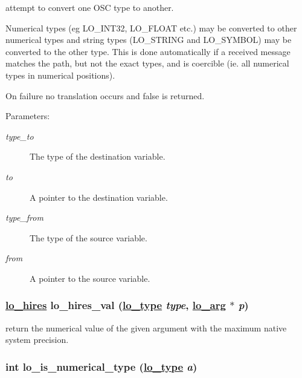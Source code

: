 attempt to convert one OSC type to another. 

Numerical types (eg LO\_\-INT32, LO\_\-FLOAT etc.) may be converted to other numerical types and string types (LO\_\-STRING and LO\_\-SYMBOL) may be converted to the other type. This is done automatically if a received message matches the path, but not the exact types, and is coercible (ie. all numerical types in numerical positions).

On failure no translation occurs and false is returned.

\begin{Desc}
\item[Parameters:]
\begin{description}
\item[{\em type\_\-to}]The type of the destination variable. \item[{\em to}]A pointer to the destination variable. \item[{\em type\_\-from}]The type of the source variable. \item[{\em from}]A pointer to the source variable. \end{description}
\end{Desc}
\hypertarget{group__liblolowlevel_gfb7036664581480c9f2e898e57704c1b}{
\subsubsection[lo\_\-hires\_\-val]{\setlength{\rightskip}{0pt plus 5cm}\hyperlink{group__liblolowlevel_g0062385786b0375d4b6954ba1fb8d52b}{lo\_\-hires} lo\_\-hires\_\-val (\hyperlink{group__liblo_g11838c576b0197c255ce805fd7434736}{lo\_\-type} {\em type}, \hyperlink{unionlo__arg}{lo\_\-arg} $\ast$ {\em p})}}
\label{group__liblolowlevel_gfb7036664581480c9f2e898e57704c1b}


return the numerical value of the given argument with the maximum native system precision. 

\hypertarget{group__liblolowlevel_gce222e42c35d0256f115e00b84e8f853}{
\subsubsection[lo\_\-is\_\-numerical\_\-type]{\setlength{\rightskip}{0pt plus 5cm}int lo\_\-is\_\-numerical\_\-type (\hyperlink{group__liblo_g11838c576b0197c255ce805fd7434736}{lo\_\-type} {\em a})}}
\label{group__liblolowlevel_gce222e42c35d0256f115e00b84e8f853}


